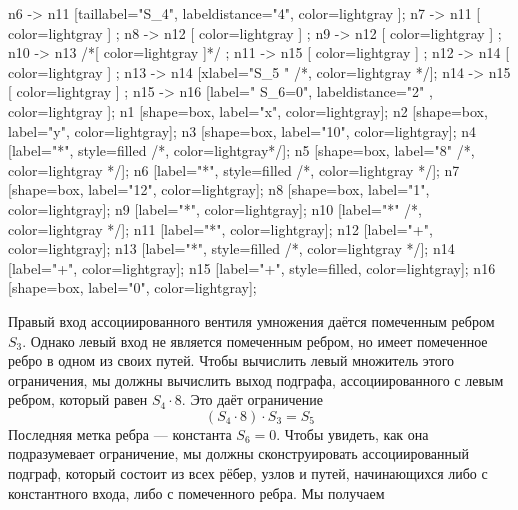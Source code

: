 \begin{example}
\begin{center}
{	n6 -> n11 [taillabel="S_4", labeldistance="4", color=lightgray ];
	n7 -> n11 [ color=lightgray ] ;
	n8 -> n12 [ color=lightgray ] ;
	n9 -> n12 [ color=lightgray ] ;
	n10 -> n13 /*[ color=lightgray ]*/ ; 
	n11 -> n15 [ color=lightgray ] ;
	n12 -> n14 [ color=lightgray ] ;	
	n13 -> n14 [xlabel="S_5  "  /*, color=lightgray */];
	n14 -> n15 [ color=lightgray ] ;
	n15 -> n16 [label="  S_6=0", labeldistance="2" , color=lightgray ];
	n1 [shape=box, label="x", color=lightgray];
	n2 [shape=box, label="y", color=lightgray];
	n3 [shape=box, label="10", color=lightgray];
	n4 [label="*", style=filled /*, color=lightgray*/];
	n5 [shape=box, label="8" /*, color=lightgray */];
	n6 [label="*", style=filled /*, color=lightgray */];
	n7 [shape=box, label="12", color=lightgray];
	n8 [shape=box, label="1", color=lightgray];
	n9 [label="*", color=lightgray];
	n10 [label="*" /*, color=lightgray */];
	n11 [label="*", color=lightgray];	
	n12 [label="+", color=lightgray];	
	n13 [label="*", style=filled /*, color=lightgray */];
	n14 [label="+", color=lightgray];
	n15 [label="+", style=filled, color=lightgray];
	n16 [shape=box, label="0", color=lightgray];		
}
\end{center}
Правый вход ассоциированного вентиля умножения даётся помеченным ребром $S_3$. Однако левый вход не является помеченным ребром, но имеет помеченное ребро в одном из своих путей. Чтобы вычислить левый множитель этого ограничения, мы должны вычислить выход подграфа, ассоциированного с левым ребром, который равен $S_4\cdot 8$. Это даёт ограничение
$$
(S_4 \cdot 8) \cdot S_3 = S_5
$$ 
Последняя метка ребра — константа $S_6=0$. Чтобы увидеть, как она подразумевает ограничение, мы должны сконструировать ассоциированный подграф, который состоит из всех рёбер, узлов и путей, начинающихся либо с константного входа, либо с помеченного ребра. Мы получаем
\begin{center}
\end{center}
\end{example}

